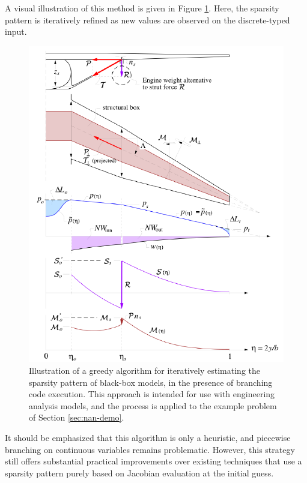A visual illustration of this method is given in Figure \ref{fig:nan-bce-greedy}. Here, the sparsity pattern is iteratively refined as new values are observed on the discrete-typed input.

\begin{figure}[H]
    \centering
    \includegraphics[page=9, width=\textwidth]{../figures/nan-propagation/cropped.pdf}
    \caption{Illustration of a greedy algorithm for iteratively estimating the sparsity pattern of black-box models, in the presence of branching code execution. This approach is intended for use with engineering analysis models, and the process is applied to the example problem of Section \ref{sec:nan-demo}.}
    \label{fig:nan-bce-greedy}
\end{figure}

It should be emphasized that this algorithm is only a heuristic, and piecewise branching on continuous variables remains problematic. However, this strategy still offers substantial practical improvements over existing techniques that use a sparsity pattern purely based on Jacobian evaluation at the initial guess.


